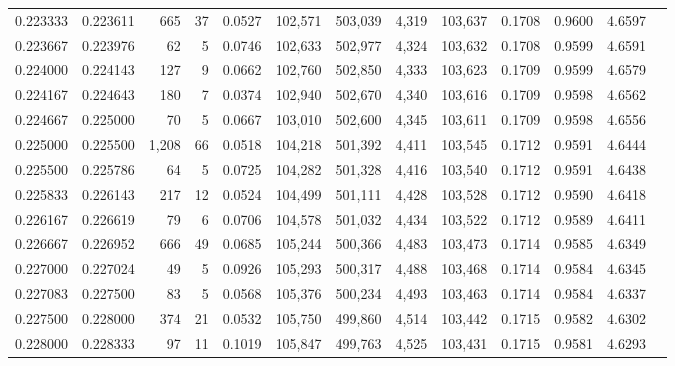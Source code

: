 \begin{tabular}{rrrrrrrrrrrrr}
0.223333 & 0.223611 &   665 &  37 &                                     0.0527 & 102,571 & 503,039 &   4,319 & 103,637 & 0.1708 & 0.9600 & 4.6597 \\
0.223667 & 0.223976 &    62 &   5 &                                     0.0746 & 102,633 & 502,977 &   4,324 & 103,632 & 0.1708 & 0.9599 & 4.6591 \\
0.224000 & 0.224143 &   127 &   9 &                                     0.0662 & 102,760 & 502,850 &   4,333 & 103,623 & 0.1709 & 0.9599 & 4.6579 \\
0.224167 & 0.224643 &   180 &   7 &                                     0.0374 & 102,940 & 502,670 &   4,340 & 103,616 & 0.1709 & 0.9598 & 4.6562 \\
0.224667 & 0.225000 &    70 &   5 &                                     0.0667 & 103,010 & 502,600 &   4,345 & 103,611 & 0.1709 & 0.9598 & 4.6556 \\
0.225000 & 0.225500 & 1,208 &  66 &                                     0.0518 & 104,218 & 501,392 &   4,411 & 103,545 & 0.1712 & 0.9591 & 4.6444 \\
0.225500 & 0.225786 &    64 &   5 &                                     0.0725 & 104,282 & 501,328 &   4,416 & 103,540 & 0.1712 & 0.9591 & 4.6438 \\
0.225833 & 0.226143 &   217 &  12 &                                     0.0524 & 104,499 & 501,111 &   4,428 & 103,528 & 0.1712 & 0.9590 & 4.6418 \\
0.226167 & 0.226619 &    79 &   6 &                                     0.0706 & 104,578 & 501,032 &   4,434 & 103,522 & 0.1712 & 0.9589 & 4.6411 \\
0.226667 & 0.226952 &   666 &  49 &                                     0.0685 & 105,244 & 500,366 &   4,483 & 103,473 & 0.1714 & 0.9585 & 4.6349 \\
0.227000 & 0.227024 &    49 &   5 &                                     0.0926 & 105,293 & 500,317 &   4,488 & 103,468 & 0.1714 & 0.9584 & 4.6345 \\
0.227083 & 0.227500 &    83 &   5 &                                     0.0568 & 105,376 & 500,234 &   4,493 & 103,463 & 0.1714 & 0.9584 & 4.6337 \\
0.227500 & 0.228000 &   374 &  21 &                                     0.0532 & 105,750 & 499,860 &   4,514 & 103,442 & 0.1715 & 0.9582 & 4.6302 \\
0.228000 & 0.228333 &    97 &  11 &                                     0.1019 & 105,847 & 499,763 &   4,525 & 103,431 & 0.1715 & 0.9581 & 4.6293 \\

\end{tabular}
